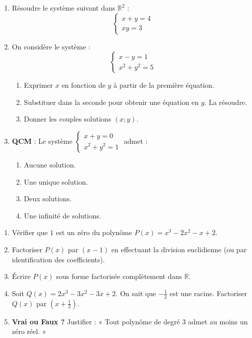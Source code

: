 \documentclass[11pt]{article}
\begin{document}
\begin{exercice}
\begin{enumerate}
    \item Résoudre le système suivant dans $\mathbb{R}^2$ :
    \[
    \left\{
    \begin{array}{l}
    x + y = 4 \\
    xy = 3
    \end{array}
    \right.
    \]
    \item On considère le système :
    \[
    \left\{
    \begin{array}{l}
    x - y = 1 \\
    x^2 + y^2 = 5
    \end{array}
    \right.
    \]
    \begin{enumerate}
        \item Exprimer $x$ en fonction de $y$ à partir de la première équation.
        \item Substituer dans la seconde pour obtenir une équation en $y$. La résoudre.
        \item Donner les couples solutions $(x;y)$.
    \end{enumerate}
    \item \textbf{QCM} : Le système $\begin{cases} x+y=0 \\ x^2+y^2=1 \end{cases}$ admet :
    \begin{enumerate}
        \item Aucune solution.
        \item Une unique solution.
        \item Deux solutions.
        \item Une infinité de solutions.
    \end{enumerate}
\end{enumerate}
\end{exercice}

\begin{exercice}
\begin{enumerate}
    \item Vérifier que $1$ est un zéro du polynôme $P(x) = x^3 - 2x^2 - x + 2$.
    \item Factoriser $P(x)$ par $(x-1)$ en effectuant la division euclidienne (ou par identification des coefficients).
    \item Écrire $P(x)$ sous forme factorisée complètement dans $\mathbb{R}$.
    \item Soit $Q(x) = 2x^3 - 3x^2 - 3x + 2$. On sait que $-\frac{1}{2}$ est une racine. Factoriser $Q(x)$ par $\left(x+\frac{1}{2}\right)$.
    \item \textbf{Vrai ou Faux ?} Justifier : « Tout polynôme de degré 3 admet au moins un zéro réel. »
\end{enumerate}
\end{exercice}
\end{document}
